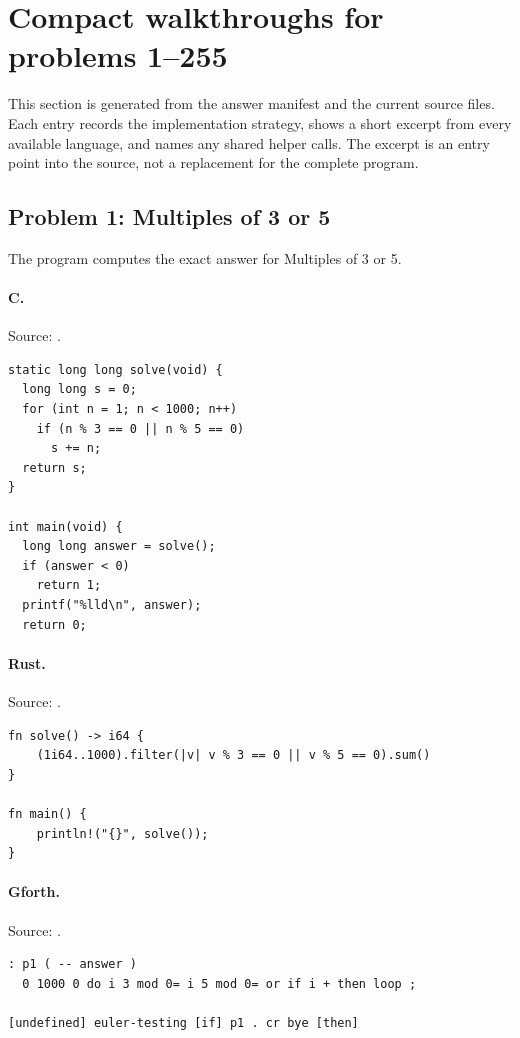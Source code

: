 \section{Compact walkthroughs for problems 1--255}
\label{sec:allwalkthroughs}

This section is generated from the answer manifest and the current source files. Each entry records the implementation strategy, shows a short excerpt from every available language, and names any shared helper calls. The excerpt is an entry point into the source, not a replacement for the complete program.

\subsection{Problem 1: Multiples of 3 or 5}
\label{walkthrough:p1}
The program computes the exact answer for Multiples of 3 or 5.

\paragraph{C.} Source: .
\begin{lstlisting}
static long long solve(void) {
  long long s = 0;
  for (int n = 1; n < 1000; n++)
    if (n % 3 == 0 || n % 5 == 0)
      s += n;
  return s;
}

int main(void) {
  long long answer = solve();
  if (answer < 0)
    return 1;
  printf("%lld\n", answer);
  return 0;
\end{lstlisting}

\paragraph{Rust.} Source: .
\begin{lstlisting}
fn solve() -> i64 {
    (1i64..1000).filter(|v| v % 3 == 0 || v % 5 == 0).sum()
}

fn main() {
    println!("{}", solve());
}
\end{lstlisting}

\paragraph{Gforth.} Source: .
\begin{lstlisting}
: p1 ( -- answer )
  0 1000 0 do i 3 mod 0= i 5 mod 0= or if i + then loop ;

[undefined] euler-testing [if] p1 . cr bye [then]
\end{lstlisting}

